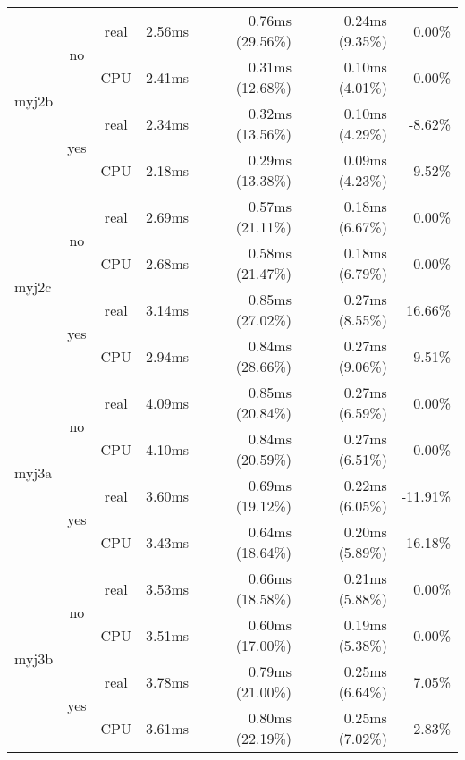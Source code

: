 \documentclass[en]{pracamgr}
\begin{document}
\begin{small}
\begin{longtable}{|l|c|c|r|r|r|r|}
\hline
\multirow{4}{*}{myj2b}    & \multirow{2}{*}{no}  & real & 2.56ms & 0.76ms (29.56\%) & 0.24ms (9.35\%) & 0.00\% \\*
                          &                      & CPU  & 2.41ms & 0.31ms (12.68\%) & 0.10ms (4.01\%) & 0.00\% \\*
                          \cline{2-7}
                          & \multirow{2}{*}{yes} & real & 2.34ms & 0.32ms (13.56\%) & 0.10ms (4.29\%) & -8.62\% \\*
                          &                      & CPU  & 2.18ms & 0.29ms (13.38\%) & 0.09ms (4.23\%) & -9.52\% \\
\hline
\multirow{4}{*}{myj2c}    & \multirow{2}{*}{no}  & real & 2.69ms & 0.57ms (21.11\%) & 0.18ms (6.67\%) & 0.00\% \\*
                          &                      & CPU  & 2.68ms & 0.58ms (21.47\%) & 0.18ms (6.79\%) & 0.00\% \\*
                          \cline{2-7}
                          & \multirow{2}{*}{yes} & real & 3.14ms & 0.85ms (27.02\%) & 0.27ms (8.55\%) & 16.66\% \\*
                          &                      & CPU  & 2.94ms & 0.84ms (28.66\%) & 0.27ms (9.06\%) & 9.51\% \\
\hline
\multirow{4}{*}{myj3a}    & \multirow{2}{*}{no}  & real & 4.09ms & 0.85ms (20.84\%) & 0.27ms (6.59\%) & 0.00\% \\*
                          &                      & CPU  & 4.10ms & 0.84ms (20.59\%) & 0.27ms (6.51\%) & 0.00\% \\*
                          \cline{2-7}
                          & \multirow{2}{*}{yes} & real & 3.60ms & 0.69ms (19.12\%) & 0.22ms (6.05\%) & -11.91\% \\*
                          &                      & CPU  & 3.43ms & 0.64ms (18.64\%) & 0.20ms (5.89\%) & -16.18\% \\
\hline
\multirow{4}{*}{myj3b}    & \multirow{2}{*}{no}  & real & 3.53ms & 0.66ms (18.58\%) & 0.21ms (5.88\%) & 0.00\% \\*
                          &                      & CPU  & 3.51ms & 0.60ms (17.00\%) & 0.19ms (5.38\%) & 0.00\% \\*
                          \cline{2-7}
                          & \multirow{2}{*}{yes} & real & 3.78ms & 0.79ms (21.00\%) & 0.25ms (6.64\%) & 7.05\% \\*
                          &                      & CPU  & 3.61ms & 0.80ms (22.19\%) & 0.25ms (7.02\%) & 2.83\% \\

\end{longtable}
\end{small}
\end{document}
